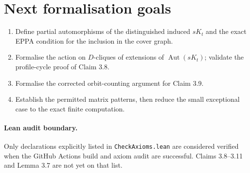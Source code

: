 \documentclass[11pt,a4paper]{article}
\begin{document}
\section*{Next formalisation goals}
\begin{enumerate}
\item Define partial automorphisms of the distinguished induced \(sK_t\)
and the exact EPPA condition for the inclusion in the cover graph.
\item Formalise the action on \(D\)-cliques of extensions of
\(\operatorname{Aut}(sK_t)\); validate the profile-cycle proof of Claim 3.8.
\item Formalise the corrected orbit-counting argument for Claim 3.9.
\item Establish the permitted matrix patterns, then reduce the small
exceptional case to the exact finite computation.
\end{enumerate}

\paragraph{Lean audit boundary.}
Only declarations explicitly listed in \texttt{CheckAxioms.lean}
are considered verified when the GitHub Actions build and axiom audit
are successful. Claims 3.8--3.11 and Lemma 3.7 are not yet on that list.
\end{document}

